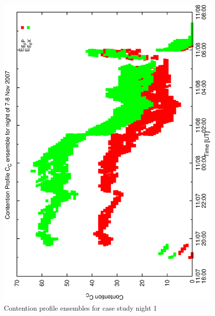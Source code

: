 \documentclass[12pt,a4paper]{article}
\begin{document}
{\begin{figure}[h]
 \begin{center}
    \includegraphics[scale=0.5, angle=-90]{figures/cont4_ensemble.eps}
    \caption{Contention profile ensembles for case study night 1} 
  \label{fig:cont4_ensemble}
 \end{center}
\end{figure}

}
\end{document}
